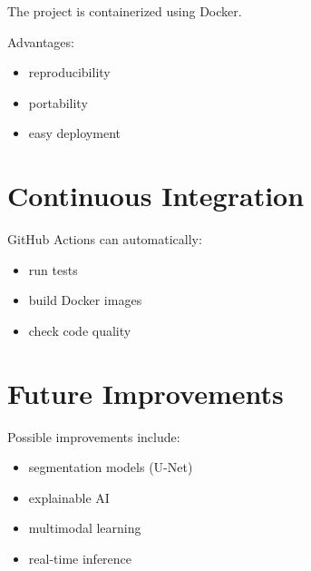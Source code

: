﻿\documentclass[11pt]{article}
\begin{document}
The project is containerized using Docker.

Advantages:

\begin{itemize}
\item reproducibility
\item portability
\item easy deployment
\end{itemize}

\section{Continuous Integration}

GitHub Actions can automatically:

\begin{itemize}
\item run tests
\item build Docker images
\item check code quality
\end{itemize}

\section{Future Improvements}

Possible improvements include:

\begin{itemize}
\item segmentation models (U-Net)
\item explainable AI
\item multimodal learning
\item real-time inference
\end{itemize}
\end{document}
